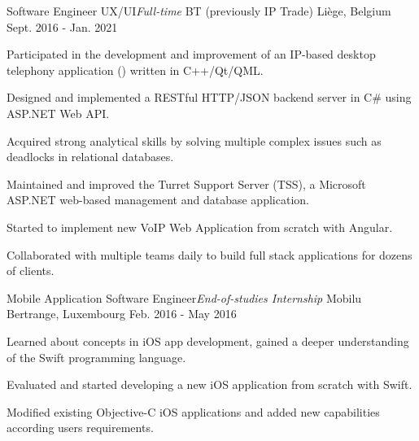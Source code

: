 \begin{cventries}
  \cventry
    {Software Engineer UX/UI{\enskip\cdotp\enskip}\it{Full-time}} %
    {BT (previously IP Trade)} %
    {Liège, Belgium} %
    {Sept. 2016 - Jan. 2021} %
    {
      \begin{cvitems} %
        \item{Participated in the development and improvement of an IP-based desktop telephony application () written in C++/Qt/QML.}
        \item{Designed and implemented a RESTful HTTP/JSON backend server in C\# using ASP.NET Web API.}
        \item{Acquired strong analytical skills by solving multiple complex issues such as deadlocks in relational databases.}
        \item{Maintained and improved the Turret Support Server (TSS), a Microsoft ASP.NET web-based management and database application.}
        \item{Started to implement new VoIP Web Application from scratch with Angular.}
        \item{Collaborated with multiple teams daily to build full stack applications for dozens of clients.}
      \end{cvitems}
    }

  \cventry
    {Mobile Application Software Engineer{\enskip\cdotp\enskip}\it{End-of-studies Internship}} %
    {Mobilu} %
    {Bertrange, Luxembourg} %
    {Feb. 2016 - May 2016} %
    {
      \begin{cvitems} %
        \item{Learned about concepts in iOS app development, gained a deeper understanding of the Swift programming language.}
        \item{Evaluated and started developing a new iOS application from scratch with Swift.}
        \item{Modified existing Objective-C iOS applications and added new capabilities according users requirements.}
      \end{cvitems}
    }


\end{cventries}
